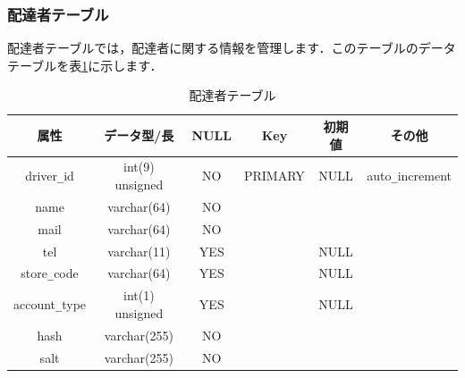 \documentclass[a4j,titlepage]{jarticle}
\begin{document}
\subsubsection{配達者テーブル}
配達者テーブルでは，配達者に関する情報を管理します．このテーブルのデータテーブルを表\ref{driver}に示します．
\begin{table}[htb]
  \caption{配達者テーブル}
  \label{driver}
  \begin{center}
    \begin{tabular}{|c|c|c|c|c|c|} \hline
      属性 & データ型/長 & NULL & Key & 初期値 & その他 \\ \hline \hline
      driver\verb|_|id & int(9) unsigned & NO & PRIMARY & NULL & auto\verb|_|increment\\ \hline
      name & varchar(64) & NO &   &  & \\ \hline
      mail & varchar(64) & NO &  &  & \\ \hline
      tel & varchar(11) & YES &  & NULL & \\ \hline
      store\verb|_|code & varchar(64) & YES &   & NULL & \\ \hline
      account\verb|_|type & int(1) unsigned & YES &   & NULL & \\ \hline
      hash & varchar(255) & NO &   &  & \\ \hline
      salt & varchar(255) & NO &   &  & \\ \hline
    \end{tabular}
  \end{center}
\end{table}
\end{document}
